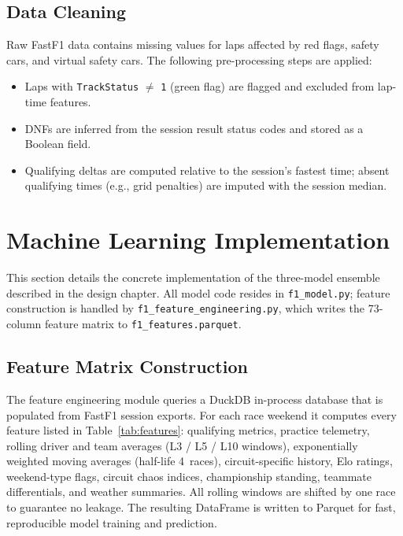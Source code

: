 \documentclass[12pt, a4paper, oneside]{report}
\begin{document}
\subsection{Data Cleaning}

Raw FastF1 data contains missing values for laps affected by red flags, safety
cars, and virtual safety cars. The following pre-processing steps are applied:

\begin{itemize}[leftmargin=*]
  \item Laps with \texttt{TrackStatus} $\neq$ \texttt{1} (green flag) are
        flagged and excluded from lap-time features.
  \item DNFs are inferred from the session result status codes and stored as a
        Boolean field.
  \item Qualifying deltas are computed relative to the session's fastest time;
        absent qualifying times (e.g., grid penalties) are imputed with the
        session median.
\end{itemize}

\section{Machine Learning Implementation}
\label{sec:ml-impl}

This section details the concrete implementation of the three-model ensemble
described in the design chapter. All model code resides in
\texttt{f1\_model.py}; feature construction is handled by
\texttt{f1\_feature\_engineering.py}, which writes the 73-column feature matrix
to \texttt{f1\_features.parquet}.

\subsection{Feature Matrix Construction}
\label{subsec:feat-matrix}

The feature engineering module queries a DuckDB in-process database that is
populated from FastF1 session exports. For each race weekend it computes every
feature listed in Table~\ref{tab:features}: qualifying metrics, practice
telemetry, rolling driver and team averages (L3 / L5 / L10 windows),
exponentially weighted moving averages (half-life 4~races), circuit-specific
history, Elo ratings, weekend-type flags, circuit chaos indices, championship
standing, teammate differentials, and weather summaries. All rolling windows are
shifted by one race to guarantee no leakage. The resulting DataFrame is written
to Parquet for fast, reproducible model training and prediction.
\end{document}
